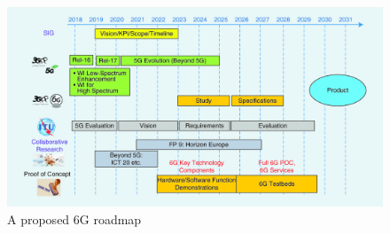 \documentclass[acmtog]{acmart}
\begin{document}
\begin{figure}[h]
  \centering
  \includegraphics[width=\linewidth]{6G_roadmap.png}
  \caption{A proposed 6G roadmap \cite{ref4}}
\end{figure}



\end{document}
